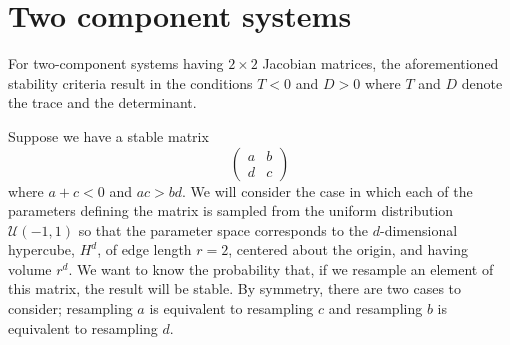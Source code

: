 \documentclass{amsart}
\theoremstyle{definition}
\theoremstyle{remark}
\numberwithin{equation}{section}
\begin{document}
\section{Two component systems}
For two-component systems having $2 \times 2$ Jacobian matrices, the aforementioned stability criteria result in the conditions $T < 0$ and $D >
0$ where $T$ and $D$ denote the trace and the determinant.

Suppose we have a stable matrix
$$
\begin{pmatrix}
a & b \\
d & c
\end{pmatrix}
$$
where $a + c < 0$ and $ac > bd$. We will consider the case in which each of the parameters defining the matrix is sampled from the uniform distribution $\mathcal{U}(-1,1)$ so that the parameter space corresponds to the $d$-dimensional hypercube, $H^d$, of edge length $r=2$, centered about the origin, and having volume $r^d$.  We want to know the probability that, if we resample an element of this matrix, the result will be stable.  By symmetry, there are two cases to consider; resampling $a$ is equivalent to resampling $c$ and resampling $b$ is equivalent
to resampling $d$.
\end{document}
